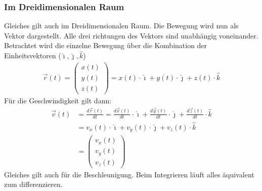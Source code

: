 \documentclass{article}
\begin{document}
\subsubsection*{Im Dreidimensionalen Raum}
Gleiches gilt auch im Dreidimensionalen Raum. Die Bewegung wird nun als Vektor dargestellt. Alle drei richtungen des Vektors
sind unabhängig voneinander. Betrachtet wird die einzelne Bewegung über die Kombination der Einheitsvektoren ($\hat{\imath},\hat{\jmath},\hat{k}$)
\begin{align}
    \vec{r}(t)=
    \left(\begin{matrix}
        x(t)\\
        y(t)\\
        z(t)
    \end{matrix}\right)
    =x(t)\cdot \hat{\imath}+y(t)\cdot \hat{\jmath}+z(t)\cdot \hat{k}
\end{align}
Für die Geschwindigkeit gilt dann:
\begin{align}
    \vec{v}(t)&=\frac{d\vec{r}(t)}{dt}=\frac{d\vec{x}(t)}{dt}\cdot \hat{\imath}+\frac{d\vec{y}(t)}{dt}\cdot \hat{\jmath}+\frac{d\vec{z}(t)}{dt}\cdot \hat{k}\\
    &=v_x(t)\cdot \hat{\imath}+v_y(t)\cdot\hat{\jmath}+v_z(t)\cdot\hat{k}\\
    &=\left(\begin{matrix}
        v_x(t)\\v_y(t)\\v_z(t)
    \end{matrix}\right)
\end{align}
Gleiches gilt auch für die Beschleunigung. Beim Integrieren läuft alles äquivalent zum differenzieren.
\end{document}
